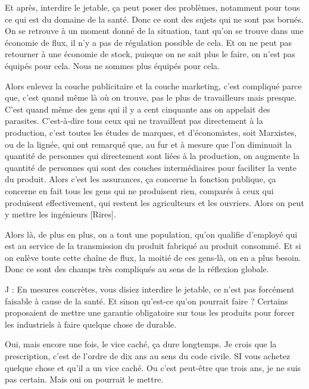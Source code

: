\begin{description}
Et après, interdire le jetable, ça peut poser des problèmes, notamment pour tous ce qui est du domaine de la santé. Donc ce sont des sujets qui ne sont pas bornés. On se retrouve à un moment donné de la situation, tant qu'on se trouve dans une économie de flux, il n'y a pas de régulation possible de cela. Et on ne peut pas retourner à une économie de stock, puisque on ne sait plus le faire, on n'est pas équipés pour cela. Nous ne sommes plus équipés pour cela. 

Alors enlevez la couche publicitaire et la couche marketing, c'est compliqué parce que, c'est quand même là où on trouve, pas le plus de travailleurs mais presque. C'est quand même des gens qui il y a cent cinquante ans on appelait des parasites. C'est-à-dire tous ceux qui ne travaillent pas directement à la production, c'est toutes les études de marques, et d'économistes, soit Marxistes, ou de la lignée, qui ont remarqué que, au fur et à mesure que l'on diminuait la quantité de personnes qui directement sont liées à la production, on augmente la quantité de personnes qui sont des couches intermédiaires pour faciliter la vente du produit. Alors c'est les assurances, ça concerne la fonction publique, ça concerne en fait tous les gens qui ne produisent rien, comparés à ceux qui produisent effectivement, qui restent les agriculteurs et les ouvriers. Alors on peut y mettre les ingénieurs [Rires].

Alors là, de plus en plus, on a tout une population, qu'on qualifie d'employé qui est au service de la transmission du produit fabriqué au produit consommé. Et si on enlève toute cette chaîne de flux, la moitié de ces gens-là, on en a plus besoin. Donc ce sont des champs très compliqués au sens de la réflexion globale. 

\vspace{1\baselineskip}

J : En mesures concrètes, vous disiez interdire le jetable, ce n'est pas forcément faisable à cause de la santé. Et sinon qu'est-ce qu'on pourrait faire ? Certains proposaient de mettre une garantie obligatoire sur tous les produits pour forcer les industriels à faire quelque chose de durable.

\vspace{1\baselineskip}

Oui, mais encore une fois, le vice caché, ça dure longtemps. Je crois que la prescription, c'est de l'ordre de dix ans au sens du code civile. SI vous achetez quelque chose et qu'il a un vice caché. Ou c'est peut-être que trois ans, je ne suis pas certain. Mais oui on pourrait le mettre.


\end{description}
